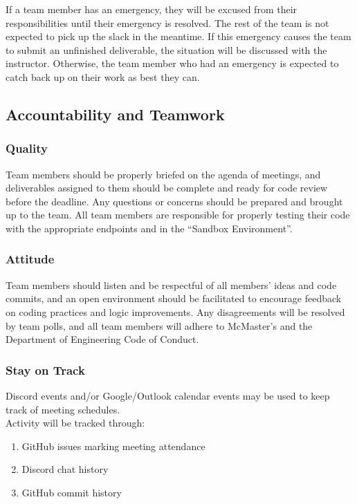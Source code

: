 \documentclass{article}
\begin{document}
If a team member has an emergency, they will be excused from their responsibilities until their emergency is resolved. The rest of the team is not expected to pick up the slack in the meantime. If this emergency causes the team to submit an unfinished deliverable, the situation will be discussed with the instructor. Otherwise, the team member who had an emergency is expected to catch back up on their work as best they can.

\subsection*{Accountability and Teamwork}

\subsubsection*{Quality} 

Team members should be properly briefed on the agenda of meetings, and deliverables assigned to them should be complete and ready for code review before the deadline. Any questions or concerns should be prepared and brought up to the team. All team members are responsible for properly testing their code with the appropriate endpoints and in the “Sandbox Environment”.

\subsubsection*{Attitude}

Team members should listen and be respectful of all members’ ideas and code commits, and an open environment should be facilitated to encourage feedback on coding practices and logic improvements. Any disagreements will be resolved by team polls, and all team members will adhere to McMaster’s and the Department of Engineering Code of Conduct.

\subsubsection*{Stay on Track}

Discord events and/or Google/Outlook calendar events may be used to keep track of meeting schedules.\\

Activity will be tracked through:
\begin{enumerate}
\item{GitHub issues marking meeting attendance}
\item{Discord chat history}
\item{GitHub commit history}
\end{enumerate}
\end{document}

